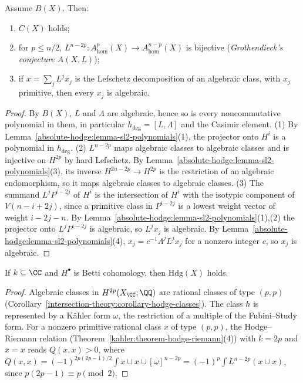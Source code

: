 \begin{proposition}\label{absolute-hodge:proposition-b-implies}
Assume $B(X)$. Then:
\begin{enumerate}
\item $C(X)$ holds;
\item for $p \leq n/2$, $L^{n-2p} \colon A^p_{\mathrm{hom}}(X) \to A^{n-p}_{\mathrm{hom}}(X)$ is bijective (\emph{Grothendieck's conjecture $A(X, L)$});
\item if $x = \sum_jL^jx_j$ is the Lefschetz decomposition of an algebraic class, with $x_j$ primitive, then every $x_j$ is algebraic.
\end{enumerate}
\end{proposition}

\begin{proof}
By $B(X)$, $L$ and $\Lambda$ are algebraic, hence so is every noncommutative polynomial in them, in particular $h_{\deg} = [L, \Lambda]$ and the Casimir element. (1) By
Lemma~\ref{absolute-hodge:lemma-sl2-polynomials}(1), the projector onto $H^i$ is a polynomial in $h_{\deg}$. (2) $L^{n-2p}$ maps algebraic classes to algebraic classes and is injective on $H^{2p}$ by hard
Lefschetz. By Lemma~\ref{absolute-hodge:lemma-sl2-polynomials}(3), its inverse $H^{2n-2p} \to H^{2p}$ is the restriction of an algebraic endomorphism, so it maps algebraic classes to algebraic classes.
(3) The summand $L^jP^{i-2j}$ of $H^i$ is the intersection of $H^i$ with the isotypic component of $V(n - i + 2j)$, since a primitive class in $P^{i-2j}$ is a lowest weight vector of weight $i - 2j - n$. By
Lemma~\ref{absolute-hodge:lemma-sl2-polynomials}(1),(2) the projector onto $L^jP^{i-2j}$ is algebraic, so $L^jx_j$ is algebraic. By Lemma~\ref{absolute-hodge:lemma-sl2-polynomials}(4),
$x_j = c^{-1}\Lambda^jL^jx_j$ for a nonzero integer $c$, so $x_j$ is algebraic.
\end{proof}

\begin{proposition}\label{absolute-hodge:proposition-hdg-char-zero}
If $k \subseteq \CC$ and $H^\bullet$ is Betti cohomology, then $\mathrm{Hdg}(X)$ holds.
\end{proposition}

\begin{proof}
Algebraic classes in $H^{2p}(X_\CC; \QQ)$ are rational classes of type $(p,p)$ (Corollary~\ref{intersection-theory:corollary-hodge-classes}). The class $h$ is represented by a K\"ahler form $\omega$, the restriction of a
multiple of the Fubini--Study form. For a nonzero primitive rational class $x$ of type $(p,p)$, the Hodge--Riemann relation (Theorem~\ref{kahler:theorem-hodge-riemann}(4)) with $k = 2p$ and $\bar x = x$ reads
$Q(x, x) > 0$, where $Q(x, x) = (-1)^{2p(2p-1)/2}\int x \cup x \cup [\omega]^{n-2p} = (-1)^p\int L^{n-2p}(x \cup x)$, since $p(2p - 1) \equiv p \pmod 2$.
\end{proof}

